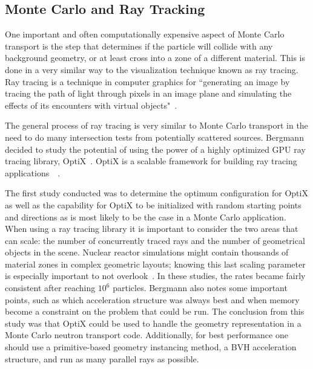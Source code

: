 \subsection{\textbf{Monte Carlo and Ray Tracking}}

One important and often computationally expensive aspect of Monte Carlo transport is the step that determines if the particle will collide with any background geometry, or at least cross into a zone of a different material.
%
This is done in a very similar way to the visualization technique known as ray tracing.
%
Ray tracing is a technique in computer graphics for ``generating an image by tracing the path of light through pixels in an image plane and simulating the effects of its encounters with virtual objects"~\cite{wikipediaRayTracing}.

The general process of ray tracing is very similar to Monte Carlo transport in the need to do many intersection tests from potentially scattered sources.
%
Bergmann decided to study the potential of using the power of a highly optimized GPU ray tracing library, OptiX~\cite{2014development}.
%
OptiX is a scalable framework for building ray tracing applications~\cite{optixProgrammingGuide}~\cite{parker2010optix}.

%
The first study conducted was to determine the optimum configuration for OptiX as well as the capability for OptiX to be initialized with random starting points and directions as is most likely to be the case in a Monte Carlo application.
%
When using a ray tracing library it is important to consider the two areas that can scale: the number of concurrently traced rays and the number of geometrical objects in the scene.
%
Nuclear reactor simulations might contain thousands of material zones in complex geometric layouts; knowing this last scaling parameter is especially important to not overlook~\cite{2014development}.
%
In these studies, the rates became fairly consistent after reaching $10^6$ particles.
Bergmann also notes some important points, such as which acceleration structure was always best and when memory become a constraint on the problem that could be run.
 The conclusion from this study was that OptiX could be used to handle the geometry representation in a Monte Carlo neutron transport code.
 Additionally, for best performance one should use a primitive-based geometry instancing method, a BVH acceleration structure, and run as many parallel rays as possible.
%

